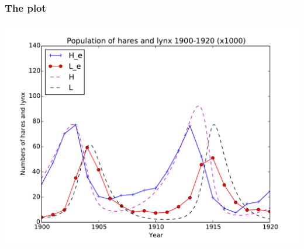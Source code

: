 \documentclass{beamer}
\begin{document}
\begin{frame}
\frametitle{The plot}

\vspace{6mm}

\centerline{\includegraphics[width=0.9\linewidth]{fig/Hudson_Bay_sim.pdf}}

\vspace{6mm}
\end{frame}
\end{document}
